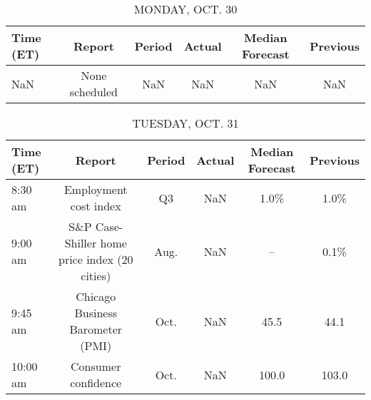 \documentclass{article}%
\begin{document}
%
\normalsize%


\begin{table}[htbp]%
\caption{MONDAY, OCT. 30}%
\centering%
\begin{adjustbox}{width=1\textwidth}%
\begin{tabular}{lccccc}
\toprule
Time (ET) &         Report & Period & Actual & Median Forecast & Previous \\
\midrule
      NaN & None scheduled &    NaN &    NaN &             NaN &      NaN \\
\bottomrule
\end{tabular}
%
\end{adjustbox}%
\end{table}

%


\begin{table}[htbp]%
\caption{TUESDAY, OCT. 31}%
\centering%
\begin{adjustbox}{width=1\textwidth}%
\begin{tabular}{lccccc}
\toprule
Time (ET) &                                        Report & Period & Actual & Median Forecast & Previous \\
\midrule
  8:30 am &                         Employment cost index &     Q3 &    NaN &            1.0\% &     1.0\% \\
  9:00 am & S\&P Case-Shiller home price index (20 cities) &   Aug. &    NaN &              -- &     0.1\% \\
  9:45 am &              Chicago Business Barometer (PMI) &   Oct. &    NaN &            45.5 &     44.1 \\
 10:00 am &                           Consumer confidence &   Oct. &    NaN &           100.0 &    103.0 \\
\bottomrule
\end{tabular}
%
\end{adjustbox}%
\end{table}

%
\end{document}
